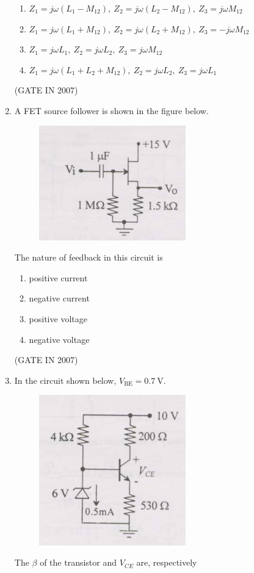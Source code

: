 \documentclass[journal]{IEEEtran}
\begin{document}
\begin{enumerate}
\begin{multicols}{2}
\begin{enumerate}
\item $Z_1 = j\omega(L_1 - M_{12}),\ Z_2 = j\omega(L_2 - M_{12}),\ Z_3 = j\omega M_{12}$  
\item $Z_1 = j\omega(L_1+M_{12}),\ Z_2 = j\omega(L_2+M_{12}),\ Z_3 = -j\omega M_{12}$  
\item $Z_1 = j\omega L_1,\ Z_2 = j\omega L_2,\ Z_3 = j\omega M_{12}$  
\item $Z_1 = j\omega(L_1+L_2+M_{12}),\ Z_2 = j\omega L_2,\ Z_3 = j\omega L_1$  
\end{enumerate}
\end{multicols}
\hfill(GATE IN 2007)
\item A FET source follower is shown in the figure below. 
\begin{figure}[H]
    \centering
      \includegraphics[width=0.6\textwidth]{24.jpg} 
      \caption{}
    \label{fig:fig24} 
\end{figure}
The nature of feedback in this circuit is  

\begin{enumerate}
\item positive current  
\item negative current  
\item positive voltage  
\item negative voltage  
\end{enumerate}
\hfill(GATE IN 2007)
\item In the circuit shown below, $V_{\mathrm{BE}} = 0.7\ \mathrm{V}$.
\begin{figure}[H]
    \centering
      \includegraphics[width=0.6\textwidth]{25.jpg} 
      \caption{}
    \label{fig:fig25} 
\end{figure}
The $\beta$ of the transistor and $V_{CE}$ are, respectively


\end{enumerate}
\end{document}
